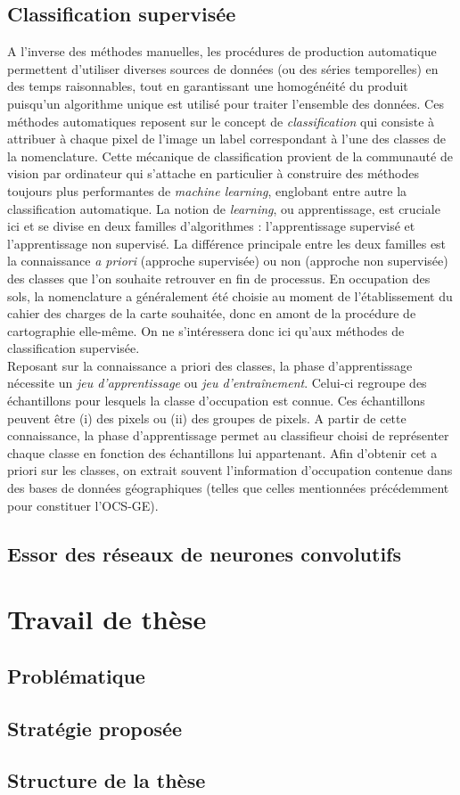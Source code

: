 \subsection{Classification supervisée}
\label{ssec:cls_super}
A l'inverse des méthodes manuelles, les procédures de production automatique permettent d'utiliser diverses sources de données (ou des séries temporelles) en des temps raisonnables, tout en garantissant une homogénéité du produit puisqu'un algorithme unique est utilisé pour traiter l'ensemble des données. Ces méthodes automatiques reposent sur le concept de \textit{classification} qui consiste à attribuer à chaque pixel de l'image un label correspondant à l'une des classes de la nomenclature. Cette mécanique de classification provient de la communauté de vision par ordinateur qui s'attache en particulier à construire des méthodes toujours plus performantes de \textit{machine learning}, englobant entre autre la classification automatique. La notion de \textit{learning}, ou apprentissage, est cruciale ici et se divise en deux familles d'algorithmes : l'apprentissage supervisé et l'apprentissage non supervisé. La différence principale entre les deux familles est la connaissance \textit{a priori} (approche supervisée) ou non (approche non supervisée) des classes que l'on souhaite retrouver en fin de processus. En occupation des sols, la nomenclature a généralement été choisie au moment de l'établissement du cahier des charges de la carte souhaitée, donc en amont de la procédure de cartographie elle-même. On ne s'intéressera donc ici qu'aux méthodes de classification supervisée.\\
Reposant sur la connaissance a priori des classes, la phase d'apprentissage nécessite un \textit{jeu d'apprentissage} ou \textit{jeu d'entraînement}. Celui-ci regroupe des échantillons pour lesquels la classe d'occupation est connue. Ces échantillons peuvent être (i) des pixels ou (ii) des groupes de pixels. A partir de cette connaissance, la phase d'apprentissage permet au classifieur choisi de représenter chaque classe en fonction des échantillons lui appartenant. Afin d'obtenir cet a priori sur les classes, on extrait souvent l'information d'occupation contenue dans des bases de données géographiques (telles que celles mentionnées précédemment pour constituer l'OCS-GE).

\subsection{Essor des réseaux de neurones convolutifs}


\section{Travail de thèse}
\subsection{Problématique}
\subsection{Stratégie proposée}
\subsection{Structure de la thèse}